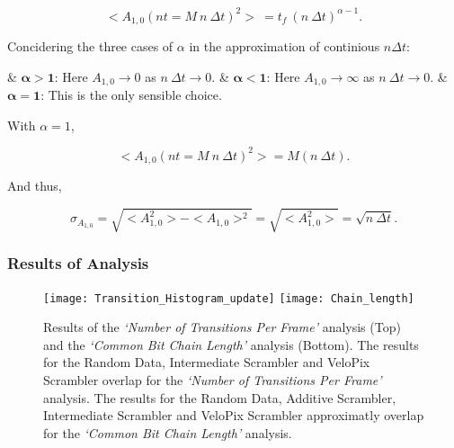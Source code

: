 \begin{description}
					\begin{equation}
						<A_{1,0}(nt = M\ n\ \Delta t)^2>\ = t_f\ (n\ \Delta t)^{\alpha -1}.
					\end{equation}

					Concidering the three cases of $\alpha$ in the approximation of continious $n \Delta t$:
					\vspace{1em}
					\begin{easylist}[itemize]
						& $\bm{\alpha > 1}$: Here $A_{1,0} \to 0$ as $n\ \Delta t \to 0$.
						& $\bm{\alpha < 1}$: Here $A_{1,0} \to \infty$ as $n\ \Delta t \to 0$.
						& $\bm{\alpha = 1}$: This is the only sensible choice.
					\end{easylist}
					\vspace{1em}
					With $\alpha =1$,

					\begin{equation}
						<A_{1,0}(nt = M\ n\ \Delta t)^2> = M (n\ \Delta t).
					\end{equation}

					And thus,

					\begin{equation}
						\sigma_{A_{1,0}} = \sqrt{<A_{1,0}^2> - <A_{1,0}>^2} = \sqrt{<A_{1,0}^2>} = \sqrt{n\ \Delta t}.
					\end{equation}

			\end{description}	

		\newpage
		\subsubsection{Results of Analysis}
		\label{subsub:alforithm_results}
			\vspace{-7mm}
			\begin{figure}[h]
				\centering
				\texttt{[image: Transition\_Histogram\_update]}
				\texttt{[image: Chain\_length]}
				\caption{Results of the \textit{`Number of Transitions Per Frame'} analysis (Top) and the \textit{`Common Bit Chain Length'} analysis (Bottom). The results for the Random Data, Intermediate Scrambler and VeloPix Scrambler overlap for the \textit{`Number of Transitions Per Frame'} analysis. The results for the Random Data, Additive Scrambler, Intermediate Scrambler and VeloPix Scrambler approximatly overlap for the \textit{`Common Bit Chain Length'} analysis.}
				\label{fig:transitions_per_frame}
			\end{figure} \FloatBarrier


